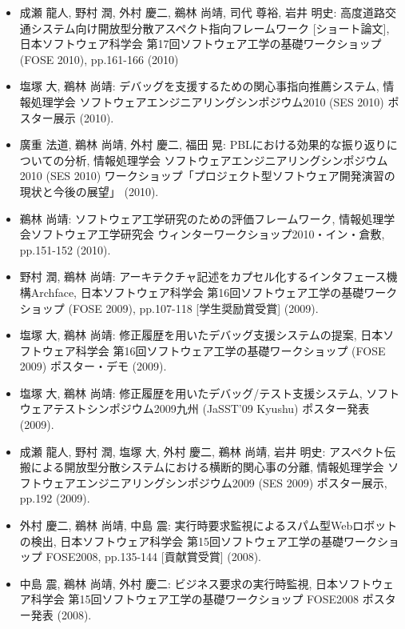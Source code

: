 \documentclass{jarticle}
\begin{document}
\begin{itemize}
\item 成瀬 龍人, 野村 潤, 外村 慶二, 鵜林 尚靖, 司代 尊裕, 岩井 明史:
高度道路交通システム向け開放型分散アスペクト指向フレームワーク [ショート論文],
日本ソフトウェア科学会 第17回ソフトウェア工学の基礎ワークショップ (FOSE 2010), pp.161-166 (2010)

\item 塩塚 大, 鵜林 尚靖:
デバッグを支援するための関心事指向推薦システム,
情報処理学会 ソフトウェアエンジニアリングシンポジウム2010 (SES 2010) ポスター展示 (2010).

\item 廣重 法道, 鵜林 尚靖, 外村 慶二, 福田 晃:
PBLにおける効果的な振り返りについての分析,
情報処理学会 ソフトウェアエンジニアリングシンポジウム2010 (SES 2010) ワークショップ「プロジェクト型ソフトウェア開発演習の現状と今後の展望」 (2010).

\item 鵜林 尚靖:
ソフトウェア工学研究のための評価フレームワーク,
情報処理学会ソフトウェア工学研究会 ウィンターワークショップ2010・イン・倉敷, pp.151-152 (2010).

\item 野村 潤, 鵜林 尚靖:
アーキテクチャ記述をカプセル化するインタフェース機構Archface,
日本ソフトウェア科学会 第16回ソフトウェア工学の基礎ワークショップ (FOSE 2009), pp.107-118 [学生奨励賞受賞] (2009).

\item 塩塚 大, 鵜林 尚靖:
修正履歴を用いたデバッグ支援システムの提案,
日本ソフトウェア科学会 第16回ソフトウェア工学の基礎ワークショップ (FOSE 2009) ポスター・デモ (2009).

\item 塩塚 大, 鵜林 尚靖:
修正履歴を用いたデバッグ/テスト支援システム,
ソフトウェアテストシンポジウム2009九州 (JaSST'09 Kyushu) ポスター発表 (2009).

\item 成瀬 龍人, 野村 潤, 塩塚 大, 外村 慶二, 鵜林 尚靖, 岩井 明史:
アスペクト伝搬による開放型分散システムにおける横断的関心事の分離,
情報処理学会 ソフトウェアエンジニアリングシンポジウム2009 (SES 2009) ポスター展示, pp.192 (2009).

\item 外村 慶二, 鵜林 尚靖, 中島 震:
実行時要求監視によるスパム型Webロボットの検出,
日本ソフトウェア科学会 第15回ソフトウェア工学の基礎ワークショップ FOSE2008,
pp.135-144 [貢献賞受賞] (2008).

\item 中島 震, 鵜林 尚靖, 外村 慶二:
ビジネス要求の実行時監視,
日本ソフトウェア科学会 第15回ソフトウェア工学の基礎ワークショップ FOSE2008 ポスター発表 (2008).


\end{itemize}
\end{document}
